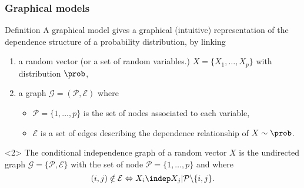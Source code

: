 \begin{frame}
  \frametitle{Graphical models}
  \begin{block}{Definition}
    A graphical model gives  a graphical (intuitive) representation of
    the dependence structure of a probability distribution, by linking
    
    \begin{enumerate}
    \item a random  vector (or a set of random  variables.)  $X = \{X_1,
      \dots, X_p\}$ with distribution $\prob$, \bigskip
    \item a graph $\mathcal{G} = (\mathcal{P}, \mathcal{E})$ where
      \begin{itemize}
      \item $\mathcal{P}=\{1,\dots,p\}$ is  the set of nodes associated
        to each variable,
      \item $\mathcal{E}$ is a  set of edges describing the dependence
        relationship of $X\sim \prob$.
      \end{itemize}
    \end{enumerate}
   \end{block}

   \vfill

  \begin{definition}<2> The  \alert{conditional independence graph}  of a
    random vector  $X$ is the \alert{undirected}  graph $\mathcal{G} =
    \{\mathcal{P},    \mathcal{E}\}$   with    the    set   of    node
    $\mathcal{P}=\{1,\dots,p\}$ and where
    \begin{equation*}
      (i,j) \notin \mathcal{E} \Leftrightarrow X_i \indep X_j | \mathcal{P} \backslash
      \{i,j\}.
    \end{equation*}
  \end{definition}

\end{frame}

